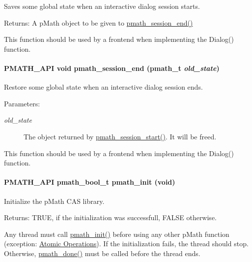 Saves some global state when an interactive dialog session starts. 

\begin{Desc}
\item[Returns:]A pMath object to be given to \hyperlink{group__frontend_g13649bdb13d4f8fe693f6b72bf3a0840}{pmath\_\-session\_\-end()}\end{Desc}
This function should be used by a frontend when implementing the Dialog() function. \hypertarget{group__frontend_g13649bdb13d4f8fe693f6b72bf3a0840}{
\paragraph[{pmath\_\-session\_\-end}]{\setlength{\rightskip}{0pt plus 5cm}PMATH\_\-API void pmath\_\-session\_\-end ({\bf pmath\_\-t} {\em old\_\-state})}\hfill}
\label{group__frontend_g13649bdb13d4f8fe693f6b72bf3a0840}


Restore some global state when an interactive dialog session ends. 

\begin{Desc}
\item[Parameters:]
\begin{description}
\item[{\em old\_\-state}]The object returned by \hyperlink{group__frontend_ge55417d3114126529937b86befd70824}{pmath\_\-session\_\-start()}. It will be freed.\end{description}
\end{Desc}
This function should be used by a frontend when implementing the Dialog() function. \hypertarget{group__frontend_gfb9f2c789bee5295c6794d16c0164943}{
\paragraph[{pmath\_\-init}]{\setlength{\rightskip}{0pt plus 5cm}PMATH\_\-API {\bf pmath\_\-bool\_\-t} pmath\_\-init (void)}\hfill}
\label{group__frontend_gfb9f2c789bee5295c6794d16c0164943}


Initialize the pMath CAS library. 

\begin{Desc}
\item[Returns:]TRUE, if the initialization was successfull, FALSE otherwise.\end{Desc}
Any thread must call \hyperlink{group__frontend_gfb9f2c789bee5295c6794d16c0164943}{pmath\_\-init()} before using any other pMath function (exception: \hyperlink{group__atomic__ops}{Atomic Operations}). If the initialization fails, the thread should stop. Otherwise, \hyperlink{group__frontend_g012705e1fd248a7cebf738bae6375dd9}{pmath\_\-done()} must be called before the thread ends.

